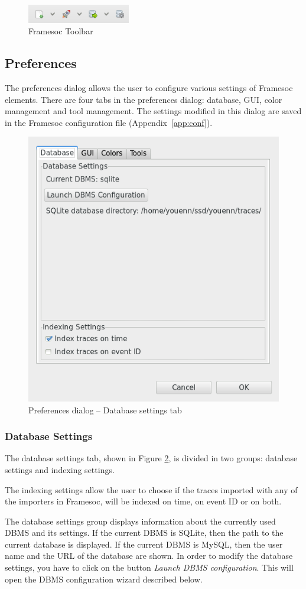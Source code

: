 \documentclass[twoside]{article}
\begin{document}
\begin{sloppypar}
\begin{figure}[h!]
  \centering
    \includegraphics[width=0.4\textwidth]{images/toolbar.png}
  \caption{Framesoc Toolbar}
  \label{fig:toolbar}
\end{figure}

\subsection{Preferences}
\label{subsec:pref}
The preferences dialog allows the user to configure various settings of Framesoc elements. There are four tabs in the preferences dialog: database, GUI, color management and tool management. The settings modified in this dialog are saved in the Framesoc configuration file (Appendix~\ref{app:conf}). 

\begin{figure}[h!]
	\centering
	\includegraphics[width=.5\textwidth]{images/pref_db.png}
	\caption{Preferences dialog -- Database settings tab}
	\label{fig:pref_dialog_db}
\end{figure} 

\subsubsection{Database Settings}
The database settings tab, shown in Figure \ref{fig:pref_dialog_db}, is divided in two groups: database settings and indexing settings. 

The indexing settings allow the user to choose if the traces imported with any of the importers in Framesoc, will be indexed on time, on event ID or on both. 

The database settings group displays information about the currently used DBMS and its settings. If the current DBMS is SQLite, then the path to the current database is displayed. If the current DBMS is MySQL, then the user name and the URL of the database are shown. In order to modify the database settings, you have to click on the button \textit{Launch DBMS configuration}. This will open the DBMS configuration wizard described below.


\end{sloppypar}
\end{document}
